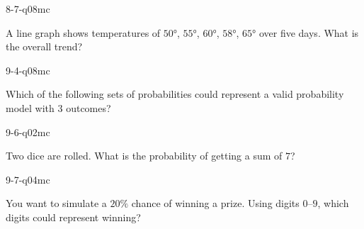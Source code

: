 \begin{practiceQuestion}{8-7-q08}{mc}
\begin{questionText}
A line graph shows temperatures of $50°$, $55°$, $60°$, $58°$, $65°$ over five days. What is the overall trend?
\end{questionText}
\end{practiceQuestion}

\begin{practiceQuestion}{9-4-q08}{mc}
\begin{questionText}
Which of the following sets of probabilities could represent a valid probability model with $3$ outcomes?
\end{questionText}
\end{practiceQuestion}

\begin{practiceQuestion}{9-6-q02}{mc}
\begin{questionText}
Two dice are rolled. What is the probability of getting a sum of $7$?
\end{questionText}
\end{practiceQuestion}

\begin{practiceQuestion}{9-7-q04}{mc}
\begin{questionText}
You want to simulate a $20\%$ chance of winning a prize. Using digits $0$--$9$, which digits could represent winning?
\end{questionText}
\end{practiceQuestion}
